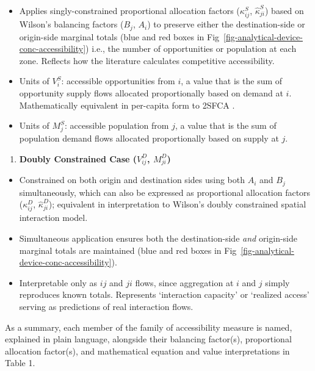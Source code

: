 \documentclass[
  10pt,
  letterpaper,
]{article}
\providecommand{\tightlist}{%
  \setlength{\itemsep}{0pt}\setlength{\parskip}{0pt}}\usepackage{longtable,booktabs,array}
\begin{document}
\begin{itemize}
\tightlist
\item
  Applies singly-constrained proportional allocation factors
  (\(\kappa_{ij}^S\), \(\hat \kappa_{ji}^S\)) based on Wilson's
  balancing factors (\(B_j\), \(A_i\)) to preserve either the
  destination-side or origin-side marginal totals (blue and red boxes in
  Fig~\ref{fig-analytical-device-conc-accessibility}) i.e., the number
  of opportunities or population at each zone. Reflects how the
  literature calculates competitive accessibility.
\item
  Units of \(V_i^S\): accessible opportunities from \(i\), a value that
  is the sum of opportunity supply flows allocated proportionally based
  on demand at \(i\). Mathematically equivalent in per-capita form to
  2SFCA \citep{luo2003}.
\item
  Units of \(M_j^S\): accessible population from \(j\), a value that is
  the sum of population demand flows allocated proportionally based on
  supply at \(j\).
\end{itemize}

\begin{enumerate}
\def\labelenumi{\arabic{enumi}.}
\setcounter{enumi}{3}
\tightlist
\item
  \textbf{Doubly Constrained Case (\(V_{ij}^D\), \(M_{ji}^D\))}
\end{enumerate}

\begin{itemize}
\tightlist
\item
  Constrained on both origin and destination sides using both \(A_i\)
  and \(B_j\) simultaneously, which can also be expressed as
  proportional allocation factors (\(\kappa_{ij}^D\),
  \(\hat \kappa_{ji}^D\)); equivalent in interpretation to Wilson's
  \citep{wilson1971} doubly constrained spatial interaction model.
\item
  Simultaneous application ensures both the destination-side \emph{and}
  origin-side marginal totals are maintained (blue and red boxes in
  Fig~\ref{fig-analytical-device-conc-accessibility}).
\item
  Interpretable only as \(ij\) and \(ji\) flows, since aggregation at
  \(i\) and \(j\) simply reproduces known totals. Represents
  `interaction capacity' or `realized access' serving as predictions of
  real interaction flows.
\end{itemize}

As a summary, each member of the family of accessibility measure is
named, explained in plain language, alongside their balancing factor(s),
proportional allocation factor(s), and mathematical equation and value
interpretations in Table 1.
\end{document}
